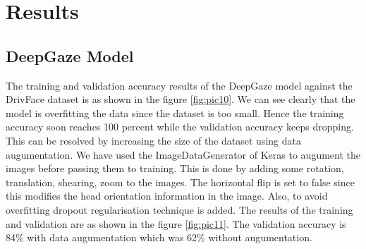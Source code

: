 \documentclass[a4paper, 12pt, oneside, BCOR1cm,toc=chapterentrywithdots]{scrbook}
\begin{document}
\section{Results}

\subsection{DeepGaze Model}

The training and validation accuracy results of the DeepGaze model against the DrivFace dataset is as shown in the figure \ref{fig:pic10}. We can see clearly that the model is overfitting the data since the dataset is too small. Hence the training accuracy soon reaches 100 percent while the validation accuracy keeps dropping. This can be resolved by increasing the size of the dataset using data augumentation. We have used the ImageDataGenerator of Keras \cite{noauthor_keras_nodate} to augument the images before passing them to training. This is done by adding some rotation, translation, shearing, zoom to the images. The horizontal flip is set to false since this modifies the head orientation information in the image. Also, to avoid overfitting dropout regularisation \cite{srivastava_dropout:_2014} technique is added. The results of the training and validation are as shown in the figure \ref{fig:pic11}. The validation accuracy is 84\% with data augumentation which was 62\% without augumentation.
\end{document}
